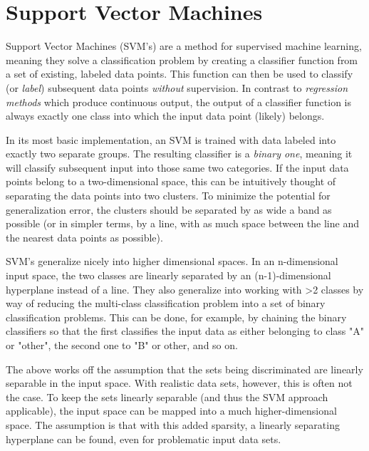 \documentclass{netsec2012}
\begin{document}
\section{Support Vector Machines}

\label{ref:svmintro}

Support Vector Machines (SVM's) are a method for supervised machine learning, meaning they solve a
classification problem by creating a classifier function from a set of existing, labeled data
points.  This function can then be used to classify (or \emph{label}) subsequent data points
\emph{without} supervision.  In contrast to \emph{regression methods} which produce continuous
output, the output of a classifier function is always exactly one class into which the input data
point (likely) belongs.

In its most basic implementation, an SVM is trained with data labeled into exactly two separate
groups.  The resulting classifier is a \emph{binary one}, meaning it will classify subsequent input
into those same two categories.  If the input data points belong to a two-dimensional space, this
can be intuitively thought of separating the data points into two clusters.  To minimize the
potential for generalization error, the clusters should be separated by as wide a band as possible
(or in simpler terms, by a line, with as much space between the line and the nearest data points as
possible). \cite{svm_chemistry}

\label{ref:multiclasssvm}

SVM's generalize nicely into higher dimensional spaces.  In an n-dimensional input space, the two
classes are linearly separated by an (n-1)-dimensional hyperplane instead of a line.  They also
generalize into working with >2 classes by way of reducing the multi-class classification problem
into a set of binary classification problems.  This can be done, for example, by chaining the binary
classifiers so that the first classifies the input data as either belonging to class "A" or "other",
the second one to "B" or other, and so on. \cite{duan2005best}

The above works off the assumption that the sets being discriminated are linearly separable in the
input space.  With realistic data sets, however, this is often not the case.  To keep the sets
linearly separable (and thus the SVM approach applicable), the input space can be mapped into a much
higher-dimensional space.  The assumption is that with this added sparsity, a linearly separating
hyperplane can be found, even for problematic input data sets. \cite{svm_chemistry}
\end{document}
